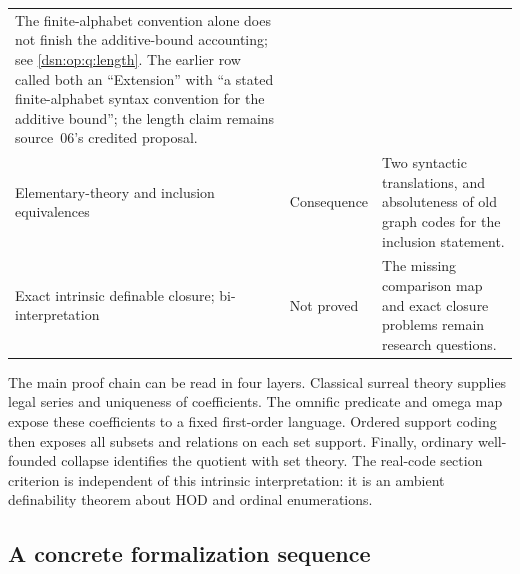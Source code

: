 \documentclass[11pt,a4paper]{article}
\numberwithin{equation}{section}
\theoremstyle{definition}
\theoremstyle{remark}
\begin{document}
\begin{longtable}{P{0.27\textwidth}P{0.18\textwidth}P{0.47\textwidth}}
The finite-alphabet convention alone does not finish the additive-bound
accounting; see \cref{dsn:op:q:length}. The earlier row called both an
``Extension'' with ``a stated finite-alphabet syntax convention for the
additive bound''; the length claim remains source~06's credited proposal.\\
Elementary-theory and inclusion equivalences & Consequence &
Two syntactic translations, and absoluteness of old graph codes for
the inclusion statement.\\
Exact intrinsic definable closure; bi-interpretation &
Not proved &
The missing comparison map and exact closure problems remain research
questions.\\
\end{longtable}
\endgroup

The main proof chain can be read in four layers.  Classical surreal
theory supplies legal series and uniqueness of coefficients.  The
omnific predicate and omega map expose these coefficients to a fixed
first-order language.  Ordered support coding then exposes all subsets
and relations on each set support.  Finally, ordinary well-founded
collapse identifies the quotient with set theory.  The real-code
section criterion is independent of this intrinsic interpretation: it
is an ambient definability theorem about HOD and ordinal enumerations.

\subsection{A concrete formalization sequence}
\end{document}
